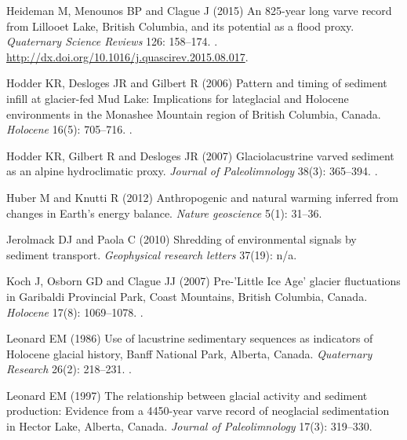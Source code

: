 \documentclass[Royal,times,doublespace,sageh]{sagej}
\begin{document}
\begin{thebibliography}{68}
Heideman M, Menounos BP and Clague J (2015) {An 825-year long varve record from
  Lillooet Lake, British Columbia, and its potential as a flood proxy}.
\newblock \emph{Quaternary Science Reviews} 126: 158--174.
\newblock {}.
\newblock \urlprefix\url{http://dx.doi.org/10.1016/j.quascirev.2015.08.017}.

Hodder KR, Desloges JR and Gilbert R (2006) {Pattern and timing of sediment
  infill at glacier-fed Mud Lake: Implications for lateglacial and Holocene
  environments in the Monashee Mountain region of British Columbia, Canada}.
\newblock \emph{Holocene} 16(5): 705--716.
\newblock {}.

Hodder KR, Gilbert R and Desloges JR (2007) {Glaciolacustrine varved sediment
  as an alpine hydroclimatic proxy}.
\newblock \emph{Journal of Paleolimnology} 38(3): 365--394.
\newblock {}.

Huber M and Knutti R (2012) {Anthropogenic and natural warming inferred from
  changes in Earth's energy balance}.
\newblock \emph{Nature geoscience} 5(1): 31--36.

Jerolmack DJ and Paola C (2010) {Shredding of environmental signals by sediment
  transport}.
\newblock \emph{Geophysical research letters} 37(19): n/a.

Koch J, Osborn GD and Clague JJ (2007) {Pre-'Little Ice Age' glacier
  fluctuations in Garibaldi Provincial Park, Coast Mountains, British Columbia,
  Canada}.
\newblock \emph{Holocene} 17(8): 1069--1078.
\newblock {}.

Leonard EM (1986) {Use of lacustrine sedimentary sequences as indicators of
  Holocene glacial history, Banff National Park, Alberta, Canada}.
\newblock \emph{Quaternary Research} 26(2): 218--231.
\newblock {}.

Leonard EM (1997) {The relationship between glacial activity and sediment
  production: Evidence from a 4450-year varve record of neoglacial
  sedimentation in Hector Lake, Alberta, Canada}.
\newblock \emph{Journal of Paleolimnology} 17(3): 319--330.


\end{thebibliography}
\end{document}
